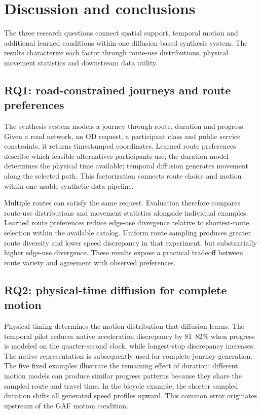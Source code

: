 \chapter{Discussion and conclusions}
\label{ch:native-discussion}

The three research questions connect spatial support, temporal motion and additional learned conditions within one diffusion-based synthesis system. The results characterize each factor through route-use distributions, physical movement statistics and downstream data utility.

\section{RQ1: road-constrained journeys and route preferences}
The synthesis system models a journey through route, duration and progress. Given a road network, an OD request, a participant class and public service constraints, it returns timestamped coordinates. Learned route preferences describe which feasible alternatives participants use; the duration model determines the physical time available; temporal diffusion generates movement along the selected path. This factorization connects route choice and motion within one usable synthetic-data pipeline.

Multiple routes can satisfy the same request. Evaluation therefore compares route-use distributions and movement statistics alongside individual examples. Learned route preferences reduce edge-use divergence relative to shortest-route selection within the available catalog. Uniform route sampling produces greater route diversity and lower speed discrepancy in that experiment, but substantially higher edge-use divergence. These results expose a practical tradeoff between route variety and agreement with observed preferences.

\section{RQ2: physical-time diffusion for complete motion}
Physical timing determines the motion distribution that diffusion learns. The temporal pilot reduces native acceleration discrepancy by 81--82\% when progress is modeled on the quarter-second clock, while longest-stop discrepancy increases. The native representation is subsequently used for complete-journey generation. The five fixed examples illustrate the remaining effect of duration: different motion models can produce similar progress patterns because they share the sampled route and travel time. In the bicycle example, the shorter sampled duration shifts all generated speed profiles upward. This common error originates upstream of the GAF motion condition.

